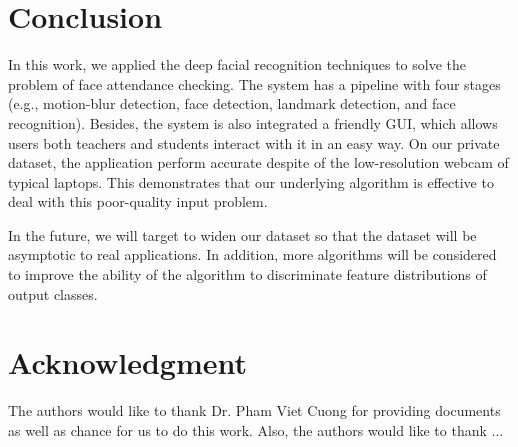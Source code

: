 \documentclass[journal, twocolumn]{IEEEtran}
\begin{document}
\section{Conclusion}
\label{conclusion}

In this work, we applied the deep facial recognition techniques to solve the problem of face attendance checking. The system has a pipeline with four stages (e.g., motion-blur detection, face detection, landmark detection, and face recognition). Besides, the system is also integrated a friendly GUI, which allows users both teachers and students interact with it in an easy way. On our private dataset, the application perform accurate despite of the low-resolution webcam of typical laptops. This demonstrates that our underlying algorithm is effective to deal with this poor-quality input problem.

In the future, we will target to widen our dataset so that the dataset will be asymptotic to real applications. In addition, more algorithms will be considered to improve the ability of the algorithm to discriminate feature distributions of output classes.


\section*{Acknowledgment}

The authors would like to thank Dr. Pham Viet Cuong for providing documents as well as chance for us to do this work. Also, the authors would like to thank ...


\begin{thebibliography}{9}

\end{thebibliography}
\end{document}
